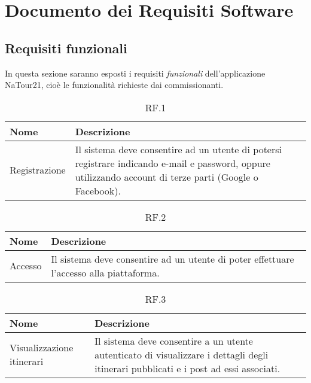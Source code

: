 \documentclass{natourDoc}
\begin{document}
	\section{Documento dei Requisiti Software}
	\subsection{Requisiti funzionali}
	In questa sezione saranno esposti i requisiti \textit{funzionali} dell'applicazione NaTour21, cioè le funzionalità richieste dai commissionanti.
	
	\begin{table}[H]
		\centering
		\begin{tabular}{ |p{5cm}|p{10.3cm}| } 
			\hline
			\rowcolor{PineGreen!70}
			\textbf{Nome} & \textbf{Descrizione} \\
			\hline
			Registrazione & Il sistema deve consentire ad un utente di potersi registrare indicando e-mail e password, oppure utilizzando account di terze parti (Google o Facebook).\\ 
			\hline
		\end{tabular}
		\caption{RF.1}
		\label{table:1}
	\end{table}
	
	\begin{table}[H]
		\centering
		\begin{tabular}{ |p{5cm}|p{10.3cm}| } 
			\hline
			\rowcolor{PineGreen!70}
			\textbf{Nome} & \textbf{Descrizione} \\
			\hline
			Accesso & Il sistema deve consentire ad un utente di poter effettuare l'accesso alla piattaforma.\\ 
			\hline
		\end{tabular}
		\caption{RF.2}
		\label{table:2}
	\end{table}
	
	\begin{table}[H]
		\centering
		\begin{tabular}{ |p{5cm}|p{10.3cm}| }
			\hline
			\rowcolor{PineGreen!70}
			\textbf{Nome} & \textbf{Descrizione} \\
			\hline
			Visualizzazione itinerari & Il sistema deve consentire a un utente autenticato di visualizzare i
			dettagli degli itinerari pubblicati e i post ad essi associati. \\
			\hline
		\end{tabular}
		\caption{RF.3}
		\label{table:3}
	\end{table}
\end{document}
